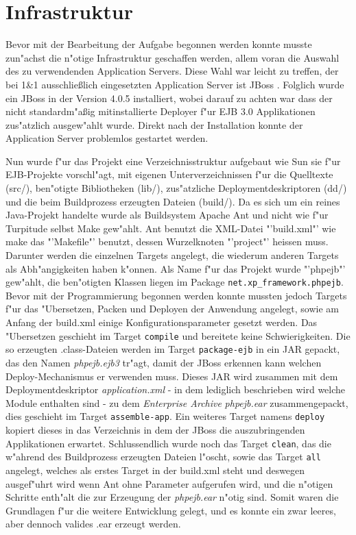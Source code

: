 \section{Infrastruktur}
\label{sec:chap2:infra}

Bevor mit der Bearbeitung der Aufgabe begonnen werden konnte musste zun"achst die n"otige Infrastruktur
geschaffen werden, allem voran die Auswahl des zu verwendenden Application Servers. Diese Wahl war leicht
zu treffen, der bei 1\&1 ausschlie\ss lich eingesetzten Application Server ist JBoss \cite{JBOSSHP}.
Folglich wurde ein JBoss in der Version 4.0.5 installiert, wobei darauf zu achten war dass der
nicht standardm"a\ss ig mitinstallierte Deployer f"ur EJB 3.0 Applikationen zus"atzlich ausgew"ahlt wurde.
Direkt nach der Installation konnte der Application Server problemlos gestartet werden.

Nun wurde f"ur das Projekt eine Verzeichnisstruktur aufgebaut wie Sun sie f"ur EJB-Projekte vorschl"agt, mit
eigenen Unterverzeichnissen f"ur die Quelltexte (src/), ben"otigte Bibliotheken (lib/), zus"atzliche 
Deploymentdeskriptoren (dd/) und die beim Buildprozess erzeugten Dateien (build/).
Da es sich um ein reines Java-Projekt handelte wurde als Buildsystem Apache Ant \cite{ANTHP} und nicht
wie f"ur Turpitude selbst Make gew"ahlt. Ant benutzt die XML-Datei "'build.xml"' wie make das "'Makefile"'
benutzt, dessen Wurzelknoten "'project"' heissen muss. Darunter werden die einzelnen Targets angelegt, die
wiederum anderen Targets als Abh"angigkeiten haben k"onnen. Als Name f"ur das Projekt wurde "'phpejb"' gew"ahlt,
die ben"otigten Klassen liegen im Package \texttt{net.xp\_framework.phpejb}. Bevor mit der Programmierung
begonnen werden konnte mussten jedoch Targets f"ur das "Ubersetzen, Packen und Deployen der Anwendung angelegt,
sowie am Anfang der build.xml einige Konfigurationsparameter gesetzt werden.
Das "Ubersetzen geschieht im Target \texttt{compile} und bereitete keine Schwierigkeiten. Die so erzeugten
.class-Dateien werden im Target \texttt{package-ejb} in ein JAR gepackt, das den Namen \emph{phpejb.ejb3} tr"agt,
damit der JBoss erkennen kann welchen Deploy-Mechanismus er verwenden muss. Dieses JAR wird zusammen mit 
dem Deploymentdeskriptor \emph{application.xml} - in dem lediglich beschrieben wird welche Module enthalten sind - zu
dem \emph{Enterprise Archive} \emph{phpejb.ear} zusammengepackt, dies geschieht im Target \texttt{assemble-app}.
Ein weiteres Target namens \texttt{deploy} kopiert dieses in das Verzeichnis in dem der JBoss die auszubringenden
Applikationen erwartet. Schlussendlich wurde noch das Target \texttt{clean}, das die w"ahrend des
Buildprozess erzeugten Dateien l"oscht, sowie das Target \texttt{all} angelegt, welches als erstes Target in der
build.xml steht und deswegen ausgef"uhrt wird wenn Ant ohne Parameter aufgerufen wird, und die n"otigen Schritte
enth"alt die zur Erzeugung der \emph{phpejb.ear} n"otig sind. Somit waren die Grundlagen f"ur die weitere
Entwicklung gelegt, und es konnte ein zwar leeres, aber dennoch valides .ear erzeugt werden.

